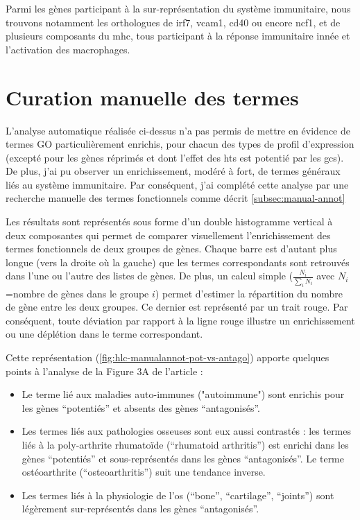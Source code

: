 \documentclass[../main.tex]{subfiles}
\begin{document}


Parmi les gènes participant à la sur-représentation du système immunitaire, nous trouvons notamment les orthologues de \gls{irf7}, \gls{vcam1}, \gls{cd40} ou encore \gls{ncf1}, et de plusieurs composants du \gls{mhc}, tous participant à la réponse immunitaire innée et l'activation des macrophages.


\section{Curation manuelle des termes}
L'analyse automatique réalisée ci-dessus n'a pas permis de mettre en évidence de termes GO particulièrement enrichis, pour chacun des types de profil d'expression (excepté pour les gènes réprimés et dont l'effet des \glspl{ht} est potentié par les \glspl{gc}).
De plus, j'ai pu observer un enrichissement, modéré à fort, de termes généraux liés au système immunitaire. Par conséquent, j'ai complété cette analyse par une recherche manuelle des termes fonctionnels comme décrit \autoref{subsec:manual-annot}
\par
Les résultats sont représentés sous forme d'un double histogramme vertical à deux composantes qui permet de comparer visuellement l'enrichissement des termes fonctionnels de deux groupes de gènes.
Chaque barre est d'autant plus longue (vers la droite où la gauche) que les termes correspondants sont retrouvés dans l'une ou l'autre des listes de gènes.
De plus, un calcul simple ($\frac{N_{i}}{\sum_{i}N_{i}}$ avec $N_i$=nombre de gènes dans le groupe $i$) permet d'estimer la répartition du nombre de gène entre les deux groupes.
Ce dernier est représenté par un trait rouge. Par conséquent, toute déviation par rapport à la ligne rouge illustre un enrichissement ou une déplétion dans le terme correspondant.
\par
Cette représentation (\autoref{fig:hlc-manualannot-pot-vs-antago}) apporte quelques points à l'analyse de la Figure 3A de l'article :
\begin{itemize} 
\item Le terme lié aux maladies auto-immunes ("autoimmune") sont enrichis pour les gènes ``potentiés'' et absents des gènes ``antagonisés''. 
\item Les termes liés aux pathologies osseuses sont eux aussi contrastés :
les termes liés à la poly-arthrite rhumatoïde (``rhumatoid arthritis'') est enrichi dans les gènes ``potentiés'' et sous-représentés dans les gènes ``antagonisés''.
Le terme ostéoarthrite (``osteoarthritis'') suit une tendance inverse.
\item Les termes liés à la physiologie de l'os (``bone'', ``cartilage'', ``joints'') sont légèrement sur-représentés dans les gènes ``antagonisés''.
\end{itemize}

\end{document}
